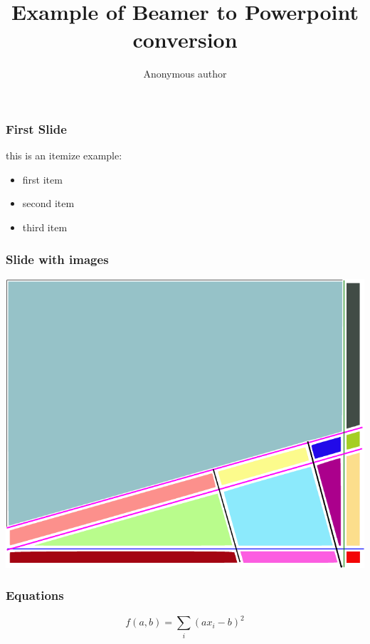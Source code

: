 \documentclass{beamer}
\title[]{Example of Beamer to Powerpoint conversion  }
\author{ Anonymous author}
\institute{No institution }
\begin{document}
\begin{frame}[plain]
\titlepage
\end{frame}

\begin{frame}
\frametitle {First Slide}
this is an itemize example: 
\begin{itemize}
\item first item
\item second item
\item third item
\end{itemize} 
\end{frame}



\begin{frame}
\frametitle {Slide with images}
\includegraphics[width=0.45\linewidth]{image.pdf}
\end{frame}

\begin{frame}
\frametitle {Equations}
$$f(a,b)=\sum_i (ax_i-b)^2$$
\end{frame}
  
\end{document}

